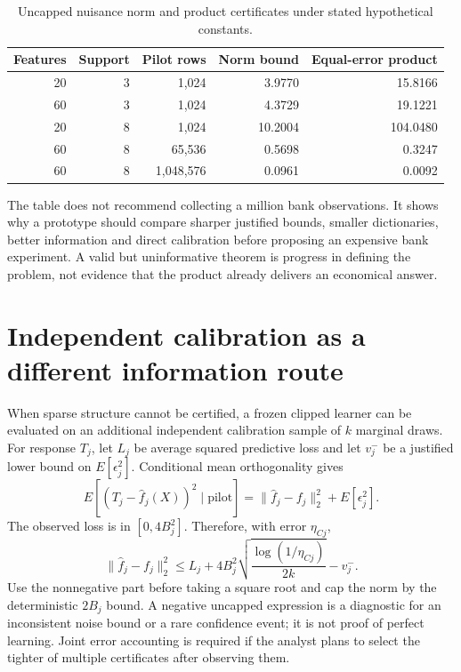 \begin{table}[htbp]
\centering\small
\caption{Uncapped nuisance norm and product certificates under stated hypothetical constants.}
\label{exec13:pilot-cost-table}
\begin{tabular}{rrrrr}
\toprule
Features & Support & Pilot rows & Norm bound & Equal-error product\\
\midrule
20 & 3 & 1,024 & 3.9770 & 15.8166\\
60 & 3 & 1,024 & 4.3729 & 19.1221\\
20 & 8 & 1,024 & 10.2004 & 104.0480\\
60 & 8 & 65,536 & 0.5698 & 0.3247\\
60 & 8 & 1,048,576 & 0.0961 & 0.0092\\
\bottomrule
\end{tabular}
\end{table}

The table does not recommend collecting a million bank observations. It shows
why a prototype should compare sharper justified bounds, smaller dictionaries,
better information and direct calibration before proposing an expensive bank
experiment. A valid but uninformative theorem is progress in defining the
problem, not evidence that the product already delivers an economical answer.

\section{Independent calibration as a different information route}

When sparse structure cannot be certified, a frozen clipped learner can be
evaluated on an additional independent calibration sample of $k$ marginal draws.
For response $T_j$, let $L_j$ be average squared predictive loss and let
$v_j^-$ be a justified lower bound on $E[\epsilon_j^2]$. Conditional mean
orthogonality gives
\begin{equation}
 E[(T_j-\widehat f_j(X))^2\mid\text{pilot}]
 =\|\widehat f_j-f_j\|_2^2+E[\epsilon_j^2].
\end{equation}
The observed loss is in $[0,4B_j^2]$. Therefore, with error $\eta_{Cj}$,
\begin{equation}
 \|\widehat f_j-f_j\|_2^2\le
 L_j+4B_j^2\sqrt{\frac{\log(1/\eta_{Cj})}{2k}}-v_j^-.
 \label{exec13:pilot-calibration}
\end{equation}
Use the nonnegative part before taking a square root and cap the norm by the
deterministic $2B_j$ bound. A negative uncapped expression is a diagnostic for
an inconsistent noise bound or a rare confidence event; it is not proof of
perfect learning. Joint error accounting is required if the analyst plans to
select the tighter of multiple certificates after observing them.

